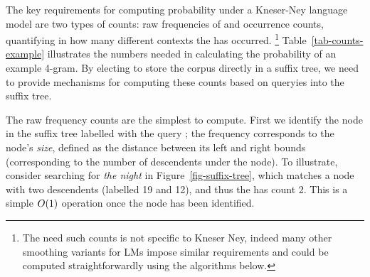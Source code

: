 
The key requirements for computing probability under a Kneser-Ney language model are two types of counts: raw frequencies of \ngrams and occurrence counts, quantifying in how many different contexts the \ngram has occurred.%
\footnote{The need such counts is not specific to Kneser Ney, indeed
  many other smoothing variants for \ngram LMs impose similar
  requirements and could be computed straightforwardly using the algorithms below.}
Table~\ref{tab-counts-example} illustrates the numbers needed in calculating the probability of an example 4-gram.
By electing to store the corpus directly in a suffix tree, we need to provide mechanisms for computing these counts based on queryies into the suffix tree.

The raw frequency counts are the simplest to compute. First we
identify the node in the suffix tree labelled with the query
\ngram; the frequency corresponds to the node's \emph{size}, defined as the
distance between its left and right bounds (corresponding to the
number of descendents under the node). To illustrate, consider
searching for \emph{the night} in  Figure~\ref{fig-suffix-tree}, which
matches a node with two descendents (labelled 19 and 12), and thus the
\ngram has count 2. This is a simple $O(1)$ operation once the
node has been identified.

